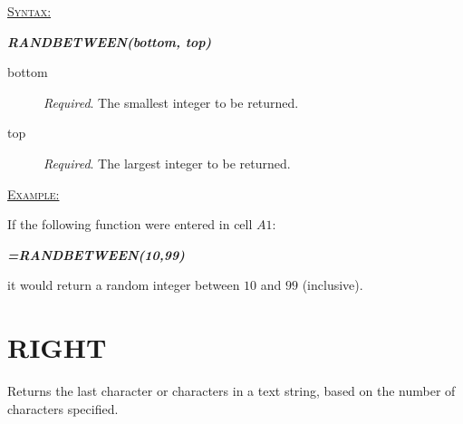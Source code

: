\begin{addmargin}[1cm]{0cm}
	
	\medskip
	\underline{\textsc{Syntax:}}
	\medskip
	
	{\color{Syntax}
		\noindent\textbf{\textit{RANDBETWEEN(bottom, top)}}
	}
	
	\begin{description}
		\item[bottom] \textit{Required}. The smallest integer to be returned.
		\item[top] \textit{Required}. The largest integer to be returned.
	\end{description}

	\medskip
	\noindent\underline{\textsc{Example:}}
	\medskip
	
	\noindent If the following function were entered in cell $ A1 $:
	
	{\color{Syntax}
		\textit{\textbf{=RANDBETWEEN(10,99)}}
	}
	
	\noindent it would return a random integer between $ 10 $ and $ 99 $ (inclusive).

\end{addmargin}

\section{RIGHT}

Returns the last character or characters in a text string, based on the number of characters specified.

